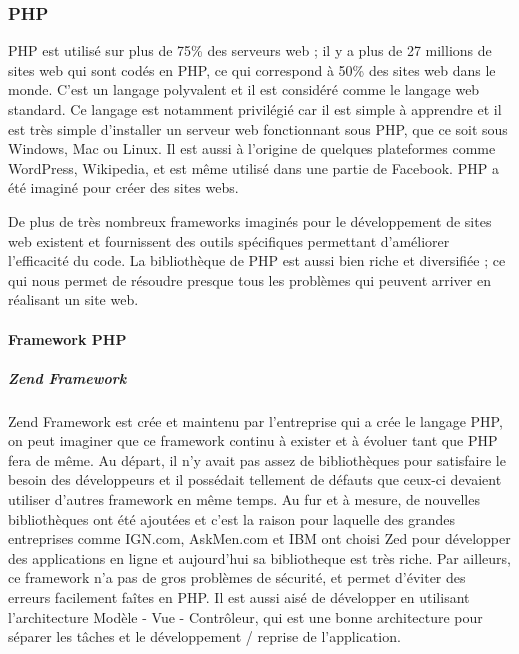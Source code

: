         \subsubsection{PHP}
        \label{subsubsec:php}
        PHP est utilisé sur plus de 75\% des serveurs web ; il y a plus de 27 millions de sites web qui
        sont codés en PHP, ce qui correspond à 50\% des sites web dans le monde. C’est un langage
        polyvalent et il est considéré comme le langage web standard. Ce langage est notamment privilégié
        car il est simple à apprendre et il est très simple d’installer un serveur web fonctionnant sous PHP,
        que ce soit sous Windows, Mac ou Linux. Il est aussi à l’origine de quelques plateformes comme
        WordPress, Wikipedia, et est même utilisé dans une partie de Facebook. PHP a été imaginé pour
        créer des sites webs.

        De plus de très nombreux frameworks imaginés pour le développement de sites web existent
        et fournissent des outils spécifiques permettant d’améliorer l’efficacité du code. La bibliothèque de
        PHP est aussi bien riche et diversifiée ; ce qui nous permet de résoudre presque tous les problèmes
        qui peuvent arriver en réalisant un site web.

        \paragraph{Framework PHP}
        \label{par:framworkPHP}

            \subparagraph{Zend Framework}
            \label{subpar:zend}
            Zend Framework est crée et maintenu par l'entreprise qui a crée le langage PHP, on peut imaginer
            que ce framework continu à exister et à évoluer tant que PHP fera de même. Au départ, il n'y avait
            pas assez de bibliothèques pour satisfaire le besoin des développeurs et il possédait tellement
            de défauts que ceux-ci devaient utiliser d’autres framework en même temps. Au fur et à mesure,
            de nouvelles bibliothèques ont été ajoutées et c'est la raison pour laquelle des grandes entreprises
            comme IGN.com, AskMen.com et IBM ont choisi Zed pour développer des applications en ligne
            et aujourd’hui  sa bibliotheque est très riche. Par ailleurs, ce framework n’a pas de gros problèmes
            de sécurité, et permet d’éviter des erreurs facilement faîtes en PHP. Il est aussi aisé de développer
            en utilisant l’architecture Modèle - Vue - Contrôleur, qui est une bonne architecture pour séparer
            les tâches et le développement / reprise de l’application.

